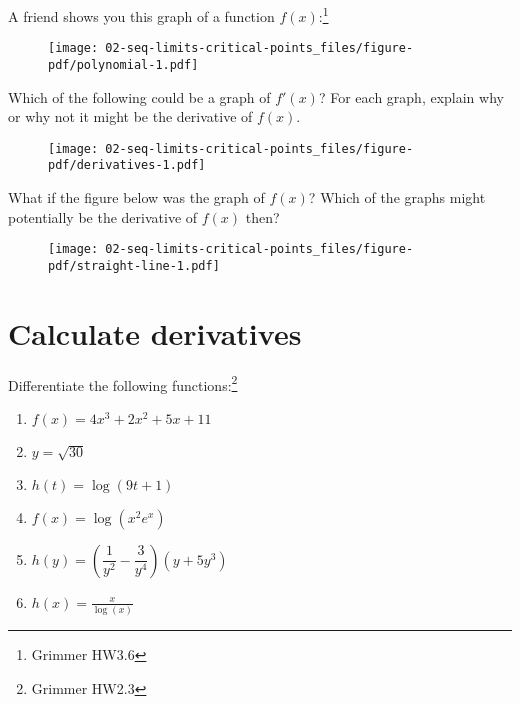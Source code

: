 \documentclass[
  letterpaper,
  DIV=11,
  numbers=noendperiod]{scrartcl}
\begin{document}
A friend shows you this graph of a function \(f(x)\):\footnote{Grimmer
  HW3.6}

\begin{figure}

{\centering \texttt{[image: 02-seq-limits-critical-points\_files/figure-pdf/polynomial-1.pdf]}

}

\end{figure}

\newpage{}

Which of the following could be a graph of \(f'(x)\)? For each graph,
explain why or why not it might be the derivative of \(f(x)\).

\begin{figure}

{\centering \texttt{[image: 02-seq-limits-critical-points\_files/figure-pdf/derivatives-1.pdf]}

}

\end{figure}

\newpage{}

What if the figure below was the graph of \(f(x)\)? Which of the graphs
might potentially be the derivative of \(f(x)\) then?

\begin{figure}

{\centering \texttt{[image: 02-seq-limits-critical-points\_files/figure-pdf/straight-line-1.pdf]}

}

\end{figure}

\newpage{}

\hypertarget{calculate-derivatives}{%
\section{Calculate derivatives}\label{calculate-derivatives}}

Differentiate the following functions:\footnote{Grimmer HW2.3}

\begin{enumerate}
\def\labelenumi{\alph{enumi}.}
\item
  \(f(x) = 4x^3 + 2x^2 + 5x + 11\)
\item
  \(y = \sqrt{30}\)
\item
  \(h(t) = \log(9t+1)\)
\item
  \(f(x) = \log(x^2e^x)\)
\item
  \(h(y) = \left( \dfrac{1}{y^2} - \dfrac{3}{y^4} \right) (y+5y^3)\)
\item
  \(h(x) = \frac{x}{\log(x)}\)
\end{enumerate}
\end{document}
